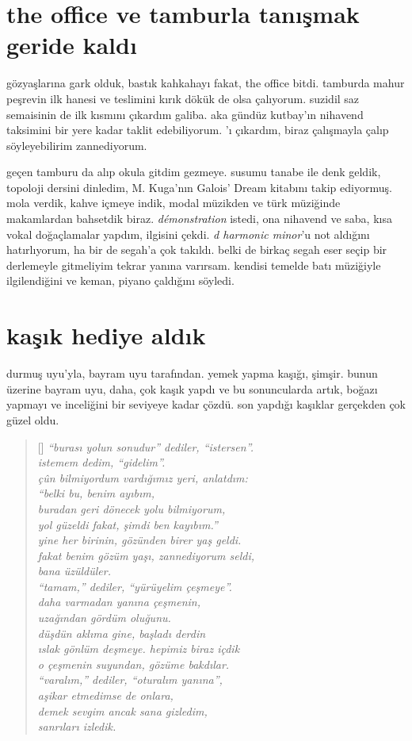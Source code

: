 \documentclass[a4paper, twocolumn, openright]{memoir}
\begin{document}
\section{the office ve tamburla tanışmak geride kaldı}
gözyaşlarına gark olduk, bastık kahkahayı fakat, the office bitdi.
tamburda mahur peşrevin ilk hanesi ve teslimini kırık dökük de olsa
çalıyorum. suzidil saz semaisinin de ilk kısmını çıkardım galiba. aka
gündüz kutbay'ın nihavend taksimini bir yere kadar taklit edebiliyorum.
'ı çıkardım, biraz çalışmayla
çalıp söyleyebilirim zannediyorum.

geçen tamburu da alıp okula gitdim gezmeye. susumu tanabe ile denk
geldik, topoloji dersini dinledim, M. Kuga'nın Galois' Dream kitabını
takip ediyormuş. mola verdik, kahve içmeye indik, modal müzikden ve türk
müziğinde makamlardan bahsetdik biraz. \textit{démonstration} istedi, ona
nihavend ve saba, kısa vokal doğaçlamalar yapdım, ilgisini çekdi.
\textit{d harmonic minor}'u not aldığını hatırlıyorum, ha bir de segah'a
çok takıldı. belki de birkaç segah eser seçip bir derlemeyle gitmeliyim
tekrar yanına varırsam. kendisi temelde batı müziğiyle ilgilendiğini ve
keman, piyano çaldığını söyledi.
\section{kaşık hediye aldık}
durmuş uyu'yla, bayram uyu tarafından. yemek yapma kaşığı, şimşir.
bunun üzerine bayram uyu, daha, çok kaşık yapdı ve bu sonuncularda artık,
boğazı yapmayı ve inceliğini bir seviyeye kadar çözdü. son yapdığı
kaşıklar gerçekden çok güzel oldu.
\begin{verse}[\versewidth]
\itshape{}
``burası yolun sonudur'' dediler, ``istersen''.\\
istemem dedim, ``gidelim''.\\
çûn bilmiyordum vardığımız yeri, anlatdım:\\
``belki bu, benim ayıbım,\\
buradan geri dönecek yolu bilmiyorum,\\
yol güzeldi fakat, şimdi ben kayıbım.''\\
yine her birinin, gözünden birer yaş geldi.\\
fakat benim gözüm yaşı, zannediyorum seldi,\\
bana üzüldüler.\\
``tamam,'' dediler, ``yürüyelim çeşmeye''.\\
daha varmadan yanına çeşmenin,\\
uzağından gördüm oluğunu.\\
düşdün aklıma gine, başladı derdin\\
ıslak gönlüm deşmeye. hepimiz biraz içdik\\
o çeşmenin suyundan, gözüme bakdılar.\\
``varalım,'' dediler, ``oturalım yanına'',\\
aşikar etmedimse de onlara,\\
demek sevgim ancak sana gizledim,\\
sanrıları izledik.\\
\end{verse}
\end{document}
